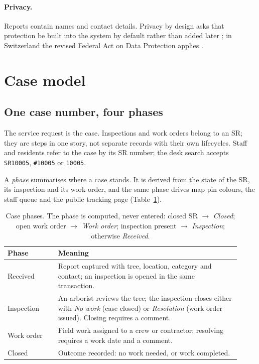 \documentclass[11pt,a4paper]{article}
\begin{document}
\paragraph{Privacy.}
Reports contain names and contact details. Privacy by design asks that protection be built into the system by default rather than added later \cite{cavoukian2009}; in Switzerland the revised Federal Act on Data Protection applies \cite{fadp}.

\section{Case model}
\label{sec:model}

\subsection{One case number, four phases}

The service request is the case. Inspections and work orders belong to an SR; they are steps in one story, not separate records with their own lifecycles. Staff and residents refer to the case by its SR number; the desk search accepts \texttt{SR10005}, \texttt{\#10005} or \texttt{10005}.

A \emph{phase} summarises where a case stands. It is derived from the state of the SR, its inspection and its work order, and the same phase drives map pin colours, the staff queue and the public tracking page (Table~\ref{tab:phase}).

\begin{table}[htbp]
\centering
\caption{Case phases. The phase is computed, never entered: closed SR $\rightarrow$ \emph{Closed}; open work order $\rightarrow$ \emph{Work order}; inspection present $\rightarrow$ \emph{Inspection}; otherwise \emph{Received}.}
\label{tab:phase}
\begin{tabular}{@{}p{0.2\linewidth}p{0.72\linewidth}@{}}
\toprule
\textbf{Phase} & \textbf{Meaning} \\
\midrule
Received & Report captured with tree, location, category and contact; an inspection is opened in the same transaction. \\
Inspection & An arborist reviews the tree; the inspection closes either with \emph{No work} (case closed) or \emph{Resolution} (work order issued). Closing requires a comment. \\
Work order & Field work assigned to a crew or contractor; resolving requires a work date and a comment. \\
Closed & Outcome recorded: no work needed, or work completed. \\
\bottomrule
\end{tabular}
\end{table}
\end{document}
